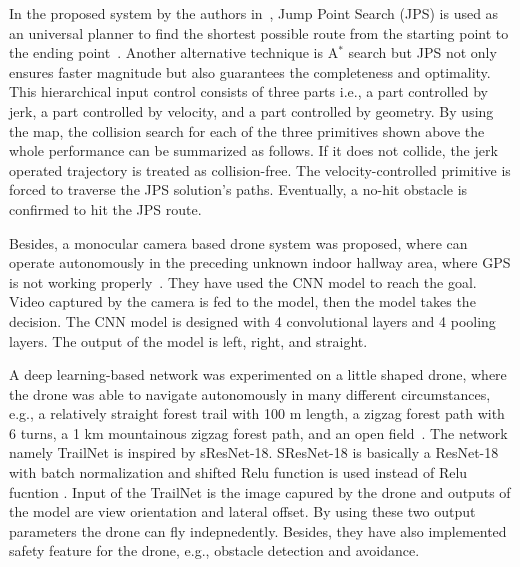 In the proposed system by the authors in~\cite{liu2017planning}, Jump Point Search (JPS) is used as an universal planner to find the shortest possible route from the starting point to the ending point~\cite{harabor2011online}. Another alternative technique is A\(^*\) search but JPS not only ensures faster magnitude but also guarantees the completeness and optimality. This hierarchical input control consists of three parts i.e., a part controlled by jerk, a part controlled by velocity, and a part controlled by geometry. By using the map, the collision search for each of the three primitives shown above the whole performance can be summarized as follows. If it does not collide, the jerk operated trajectory is treated as collision-free. The velocity-controlled primitive is forced to traverse the JPS solution's paths. Eventually, a no-hit obstacle is confirmed to hit the JPS route. 


Besides, a monocular camera based drone system was proposed, where can operate autonomously in the preceding unknown indoor hallway area, where GPS is not working properly~\cite{padhy2018deep}. They have used the CNN model to reach the goal. Video captured by the camera is fed to the model, then the model takes the decision. The CNN model is designed with 4 convolutional layers and 4 pooling layers. The output of the model is left, right, and straight.

A deep learning-based network was experimented on a little shaped drone, where the drone was able to navigate autonomously in many different circumstances, e.g., a  relatively straight forest trail with 100 m length, a  zigzag forest path with 6 turns, a 1 km mountainous zigzag forest path, and an open field~\cite{smolyanskiy2017toward}. The network namely TrailNet is inspired by sResNet-18. SResNet-18 is basically a ResNet-18 with batch normalization and shifted Relu function is used instead of Relu fucntion \cite{he2016deep}. Input of the TrailNet is the image capured by the drone and outputs of the model are view orientation and lateral offset. By using these two output parameters the drone can fly indepnedently. Besides, they have also implemented safety feature for the drone, e.g., obstacle detection and avoidance.


